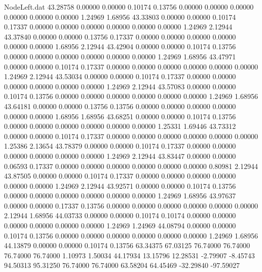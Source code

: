 \begin{filecontents}{NodeLeft.dat}
  43.28758    0.00000    0.00000     0.10174    0.13756    0.00000    0.00000    0.00000    0.00000    0.00000    0.00000    1.24969    1.68956
  43.33803    0.00000    0.00000     0.10174    0.17337    0.00000    0.00000    0.00000    0.00000    0.00000    0.00000    1.24969    2.12944
  43.37840    0.00000    0.00000     0.13756    0.17337    0.00000    0.00000    0.00000    0.00000    0.00000    0.00000    1.68956    2.12944
  43.42904    0.00000    0.00000     0.10174    0.13756    0.00000    0.00000    0.00000    0.00000    0.00000    0.00000    1.24969    1.68956
  43.47971    0.00000    0.00000     0.10174    0.17337    0.00000    0.00000    0.00000    0.00000    0.00000    0.00000    1.24969    2.12944
  43.53034    0.00000    0.00000     0.10174    0.17337    0.00000    0.00000    0.00000    0.00000    0.00000    0.00000    1.24969    2.12944
  43.57083    0.00000    0.00000     0.10174    0.13756    0.00000    0.00000    0.00000    0.00000    0.00000    0.00000    1.24969    1.68956
  43.64181    0.00000    0.00000     0.13756    0.13756    0.00000    0.00000    0.00000    0.00000    0.00000    0.00000    1.68956    1.68956
  43.68251    0.00000    0.00000     0.10174    0.13756    0.00000    0.00000    0.00000    0.00000    0.00000    0.00000    1.25331    1.69446
  43.73312    0.00000    0.00000     0.10174    0.17337    0.00000    0.00000    0.00000    0.00000    0.00000    0.00000    1.25386    2.13654
  43.78379    0.00000    0.00000     0.10174    0.17337    0.00000    0.00000    0.00000    0.00000    0.00000    0.00000    1.24969    2.12944
  43.83447    0.00000    0.00000     0.06593    0.17337    0.00000    0.00000    0.00000    0.00000    0.00000    0.00000    0.80981    2.12944
  43.87505    0.00000    0.00000     0.10174    0.17337    0.00000    0.00000    0.00000    0.00000    0.00000    0.00000    1.24969    2.12944
  43.92571    0.00000    0.00000     0.10174    0.13756    0.00000    0.00000    0.00000    0.00000    0.00000    0.00000    1.24969    1.68956
  43.97637    0.00000    0.00000     0.17337    0.13756    0.00000    0.00000    0.00000    0.00000    0.00000    0.00000    2.12944    1.68956
  44.03733    0.00000    0.00000     0.10174    0.10174    0.00000    0.00000    0.00000    0.00000    0.00000    0.00000    1.24969    1.24969
  44.08794    0.00000    0.00000     0.10174    0.13756    0.00000    0.00000    0.00000    0.00000    0.00000    0.00000    1.24969    1.68956
  44.13879    0.00000    0.00000     0.10174    0.13756   63.34375   67.03125   76.74000   76.74000   76.74000   76.74000    1.10973    1.50034
  44.17934   13.15796   12.28531    -2.79907   -8.45743   94.50313   95.31250   76.74000   76.74000   63.58204   64.45469  -32.29840  -97.59027

\end{filecontents}
